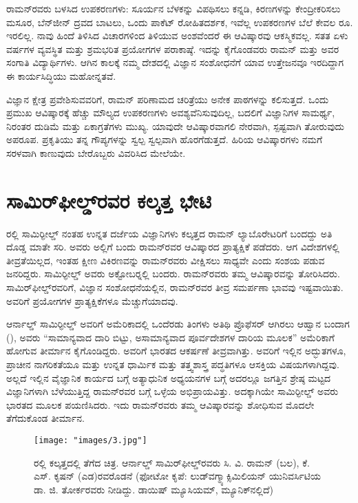 ರಾಮನ್‍ರವರು ಬಳಸಿದ ಉಪಕರಣಗಳು: ಸೂರ್ಯನ ಬೆಳಕನ್ನು ವಿಪಥಿಸಲು ಕನ್ನಡಿ, ಕಿರಣಗಳನ್ನು ಕೇಂದ್ರೀಕರಿಸಲು ಮಸೂರ, ಬೆನ್‍ಜೀನ್ ದ್ರವದ ಬಾಟಲು, ಒಂದು ಪಾಕೆಟ್ ರೋಹಿತದರ್ಶಕ, ಇವೆಲ್ಲ ಉಪಕರಣಗಳ ಬೆಲೆ ಕೇವಲ ರೂ. ಇರಲಿಲ್ಲ. ನಾವು ಹಿಂದೆ ತಿಳಿಸಿದ ವಿಚಾರಗಳಿಂದ ತಿಳಿಯುವ ಅಂಶವೆಂದರೆ ಈ ಆವಿಷ್ಕಾರವು ಆಕಸ್ಮಿಕವಲ್ಲ. ಸತತ ಏಳು ವರ್ಷಗಳ ವ್ಯವಸ್ಥಿತ ಮತ್ತು ಶ್ರಮಭರಿತ ಪ್ರಯೋಗಗಳ ಪರಾಕಾಷ್ಠೆ. ಇದನ್ನು ಕೈಗೊಂಡವರು ರಾಮನ್ ಮತ್ತು ಅವರ ಸಂಗಾತಿ ವಿದ್ಯಾರ್ಥಿಗಳು. ಆಗಿನ ಕಾಲಕ್ಕೆ ನಮ್ಮ ದೇಶದಲ್ಲಿ ವಿಜ್ಞಾನ ಸಂಶೋಧನೆಗೆ ಯಾವ ಉತ್ತೇಜನವೂ ಇರದಿದ್ದಾಗ ಈ ಕಾರ್ಯಸಿದ್ಧಿಯು ಮಹೋನ್ನತವೆ.

ವಿಜ್ಞಾನ ಕ್ಷೇತ್ರ ಪ್ರವೇಶಿಸುವವರಿಗೆ, ರಾಮನ್ ಪರಿಣಾಮದ ಚರಿತ್ರೆಯು ಅನೇಕ ಪಾಠಗಳನ್ನು ಕಲಿಸುತ್ತದೆ. ಒಂದು ಪ್ರಮುಖ ಆವಿಷ್ಕಾರಕ್ಕೆ ಹೆಚ್ಚು ಮೌಲ್ಯದ ಉಪಕರಣಗಳು ಅವಶ್ಯವೆನಿಸುವುದಿಲ್ಲ, ಬದಲಿಗೆ ವಿಜ್ಞಾನಿಗಳ ಸಾಮರ್ಥ್ಯ, ನಿರಂತರ ದುಡಿಮೆ ಮತ್ತು ಏಕಾಗ್ರತೆಗಳು ಮುಖ್ಯ. ಯಾವುದೇ ಆವಿಷ್ಕಾರವಾಗಲಿ ನೇರವಾಗಿ, ಸ್ಪಷ್ಟವಾಗಿ ತೋರುವುದು ಅಪರೂಪ. ಪ್ರಕೃತಿಯು ತನ್ನ ಗೌಪ್ಯಗಳನ್ನು ಸ್ವಲ್ಪ ಸ್ವಲ್ಪವಾಗಿ ಹೊರಗೆಡುತ್ತದೆ. ಹಿರಿಯ ಆವಿಷ್ಕಾರಗಳು ನಮಗೆ ಸರಳವಾಗಿ ಕಾಣುವುದು ಬೇರೊಬ್ಬರು ವಿವರಿಸಿದ ಮೇಲೆಯೇ.


\section{ಸಾಮಿರ್‌ಫೀಲ್ಡ್‌ರವರ ಕಲ್ಕತ್ತ ಭೇಟಿ}

ರಲ್ಲಿ ಸಾಮಿರ್‍ಫೀಲ್ಡ್ ನಂತಹ ಉನ್ನತ ದರ್ಜೆಯ ವಿಜ್ಞಾನಿಗಳು ಕಲ್ಕತ್ತದ ರಾಮನ್ ಲ್ಯಾಬೊರೇಟರಿಗೆ ಬಂದದ್ದು ಅತಿ ದೊಡ್ಡ ಮಾತೇ ಸರಿ. ಅವರು ಅಲ್ಲಿಗೆ ಬಂದು ರಾಮನ್‍ರವರ ಆವಿಷ್ಕಾರದ ಪ್ರಾತ್ಯಕ್ಷಿಕೆ ಪಡೆದರು. ಆಗ ವಿದೇಶಗಳಲ್ಲಿ ತೀವ್ರತೆಯಿಲ್ಲದ, ಇಂತಹ ಕ್ಷೀಣ ವಿಕಿರಣವನ್ನು ರಾಮನ್‍ರವರು ವೀಕ್ಷಿಸಲು ಸಾಧ್ಯವೇ ಎಂದು ಸಂಶಯ ಪಡುವ ಜನರಿದ್ದರು. ಸಾಮಿರ್‍ಫೀಲ್ಡ್ ಅವರು  ಅಕ್ಟೋಬರ್‍ನಲ್ಲಿ ಬಂದರು. ರಾಮನ್‍ರವರು ತಮ್ಮ ಆವಿಷ್ಕಾರವನ್ನು ತೋರಿಸಿದರು. ಸಾಮಿರ್‌ಫೀಲ್ಡ್‌ರವರಿಗೆ, ವಿಜ್ಞಾನ ಸಂಶೋಧನೆಯಲ್ಲಿನ, ರಾಮನ್‍ರವರ ತೀವ್ರ ಸಮರ್ಪಣಾ ಭಾವವು ಇಷ್ಟವಾಯಿತು. ಅವರಿಗೆ ಪ್ರಯೋಗಗಳ ಪ್ರಾತ್ಯಕ್ಷಿಕೆಗಳೂ ಮೆಚ್ಚುಗೆಯಾದವು.

\vskip 2.5pt

ಆರ್ನಾಲ್ಡ್ ಸಾಮಿರ್‍ಫೀಲ್ಡ್ ಅವರಿಗೆ ಅಮೆರಿಕಾದಲ್ಲಿ ಒಂದೆರಡು ತಿಂಗಳು ಅತಿಥಿ ಪ್ರೊಫೆಸರ್ ಆಗಿರಲು ಆಹ್ವಾನ ಬಂದಾಗ (), ಅವರು “ಸಾಮಾನ್ಯವಾದ ದಾರಿ ಬಿಟ್ಟು, ಅಸಾಮಾನ್ಯವಾದ ಪೂರ್ವದೇಶಗಳ ದಾರಿಯ ಮೂಲಕ” ಅಮೆರಿಕಾಗೆ ಹೋಗುವ ತೀರ್ಮಾನ ಕೈಗೊಂಡಿದ್ದರು. ಅವರಿಗೆ ಭಾರತದ ಆಕರ್ಷಣೆ ತೀವ್ರವಾಗಿತ್ತು. ಅವರಿಗೆ ಇಲ್ಲಿನ ಅದ್ಭುತಗಳೂ, ಪ್ರಾಚೀನ ನಾಗರಿಕತೆಯೂ ಮತ್ತು ಉನ್ನತ ಧಾರ್ಮಿಕ ಮತ್ತು ತತ್ತ್ವಶಾಸ್ತ್ರ ಪದ್ಧತಿಗಳೂ ಆಸಕ್ತಿಯ ವಿಷಯಗಳಾಗಿದ್ದವು. ಅಲ್ಲದೆ ಇಲ್ಲಿನ ವೈಜ್ಞಾನಿಕ ಕಾರ್ಯದ ಬಗ್ಗೆ ಅತ್ಯಾಧುನಿಕ ಅಧ್ಯಯನಗಳ ಬಗ್ಗೆ ಅದರಲ್ಲೂ ಜಗತ್ತಿನ ಶ್ರೇಷ್ಠ ಮಟ್ಟದ ವಿಜ್ಞಾನಿಗಳಾಗಿ ಬೆಳೆಯುತ್ತಿದ್ದ ರಾಮನ್‍ರವರ ಬಗ್ಗೆ ಒಳ್ಳೆಯ ಅಭಿಪ್ರಾಯವಿತ್ತು. ಅದಕ್ಕಾಗಿಯೇ ಸಾಮಿರ್‍ಫೀಲ್ಡ್ ಅವರು ಭಾರತದ ಮೂಲಕ ಪಯಣಿಸಿದರು. ಇದು ರಾಮನ್‍ರವರು ತಮ್ಮ ಆವಿಷ್ಕಾರವನ್ನು ಶೋಧಿಸುವ ಮೊದಲೇ ತೆಗೆದುಕೊಂಡ ತೀರ್ಮಾನ.

\vskip 1pt

\begin{figure}[!htbp]
\texttt{[image: "images/3.jpg"]}
\caption{ರಲ್ಲಿ ಕಲ್ಕತ್ತದಲ್ಲಿ ತೆಗೆದ ಚಿತ್ರ. ಆರ್ನಾಲ್ಡ್ ಸಾಮಿರ್‌ಫೀಲ್ಡ್‌ರವರು ಸಿ. ವಿ. ರಾಮನ್ (ಬಲ), ಕೆ. ಎಸ್. ಕೃಷನ್ (ಎಡ)ರವರೊಡನೆ (ಫೋಟೋ ಕೃಪೆ: ಲುಡ್‍ವಗ್\enginline{-}ಮ್ಯಾಕ್ಸಿಮಿಲಿಯನ್ ಯುನಿವರ್ಸಿಟಿಯ ಡಾ. ಜಿ. ತೋರ್ಕರವರು ನೀಡಿದ್ದು. ಡಾಯಿಷ್ ಮ್ಯೂಸಿಯಮ್, ಮ್ಯೂನಿಕ್‍ನಲ್ಲಿದೆ)}\label{chap1-fig04}
\end{figure}

